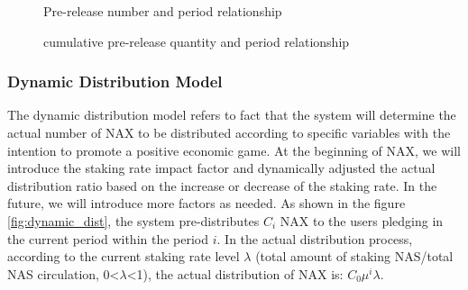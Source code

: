 \begin{figure}[h]
\centering
\begin{minipage}[5cm]{.45\textwidth}
\centering
\caption{Pre-release number and period relationship}\label{dist}

\vspace{\baselineskip}
\end{minipage}\qquad
\begin{minipage}[5cm]{.45\textwidth}
\centering
\caption{cumulative pre-release quantity and period relationship}\label{acc}
\end{minipage}
\end{figure}

\subsubsection{Dynamic Distribution Model}
The dynamic distribution model refers to fact that the system will determine the actual number of NAX to be distributed according to specific variables with the intention to promote a positive economic game. At the beginning of NAX, we will introduce the staking rate impact factor and dynamically adjusted the actual distribution ratio based on the increase or decrease of the staking rate. In the future, we will introduce more  factors as needed. As shown in the figure \ref{fig:dynamic_dist}, the system pre-distributes $C_i$ NAX to the users pledging in the current period within the period $i$. In the actual distribution process, according to the current staking rate level $\lambda$ (total amount of staking NAS/total NAS circulation, 0<$\lambda$<1), the actual distribution of NAX is: $C_0 \mu ^i\lambda$.

